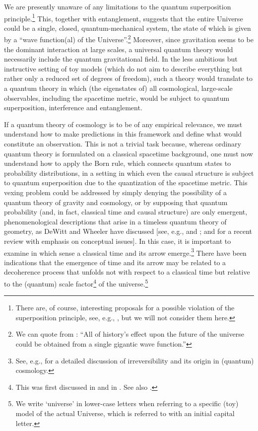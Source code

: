 \documentclass[12pt]{iopart}
\begin{document}
We are presently unaware of any limitations to the quantum superposition principle.\footnote{There are, of course, interesting proposals for a possible violation of the superposition principle, see, e.g., \citet{RevModPhys.85.471}, but we will not consider them here.} This, together with entanglement, suggests that the entire Universe could be a single, closed, quantum-mechanical system, the state of which is given by a ``wave function(al) of the Universe''.\footnote{We can quote from
\citet[p. 58]{feynman2010quantum}: ``All of history's effect upon the future of the universe could be obtained from a single gigantic wave function.''} Moreover, since gravitation seems to be the dominant interaction at large scales, a universal quantum theory would necessarily include the quantum gravitational field. In the less ambitious but instructive setting of toy models (which do not aim to describe everything but rather only a reduced set of degrees of freedom), such a theory would translate to a quantum theory in which (the eigenstates of) all cosmological, large-scale observables, including the spacetime metric, would be subject to quantum superposition, interference and entanglement.

If a quantum theory of cosmology is to be of any empirical relevance, we must understand how to make predictions in this framework and define what would constitute an observation. This is not a trivial task because, whereas ordinary quantum theory is formulated on a classical spacetime background, one must now understand how to apply the Born rule, which connects quantum states to probability distributions, in a setting in which even the causal structure is subject to quantum superposition due to the quantization of the spacetime metric. This vexing problem could be addressed by simply denying the possibility of a quantum theory of gravity and cosmology, or by supposing that quantum probability (and, in fact, classical time and causal structure) are only emergent, phenomenological descriptions that arise in a timeless quantum theory of geometry, as DeWitt and Wheeler have discussed [see, e.g., \citet{DeWitt:1967yk} and \citet{Wheeler:1968iap}; and \citet{Kiefer:2021zdq} for a recent review with emphasis on conceptual issues]. In this case, it is important to examine in which sense a classical time and its arrow emerge.\footnote{See, e.g., \citet{Zeh1989-ZEHTPB} for a detailed discussion of irreversibility and its origin in (quantum) cosmology.} There have been indications that the emergence of time and its arrow may be related to a decoherence process that unfolds not with respect to a classical time but relative to the (quantum) scale factor\footnote{This was first discussed in \citet{Zeh:1986ix} and in \citet{Kiefer:1987ft}. See also \citet{Giulini:1996nw}.} of the universe.\footnote{We write `universe' in lower-case letters when referring to a specific (toy) model of the actual Universe, which is referred to with an initial capital letter.}
\end{document}

